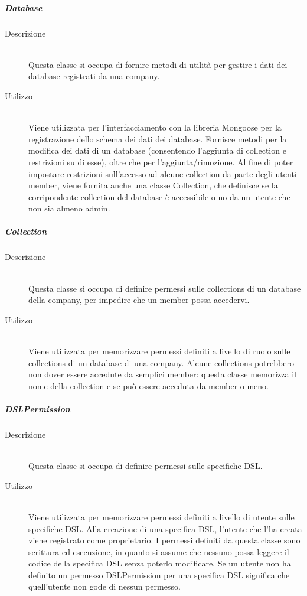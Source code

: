 \subparagraph{Database}
\begin{description}
\item[Descrizione] \hfill \\
Questa classe si occupa di fornire metodi di utilità per gestire i dati dei database registrati da una company.
\item[Utilizzo] \hfill \\
Viene utilizzata per l’interfacciamento con la libreria Mongoose per la registrazione dello schema dei dati dei database. Fornisce metodi per la modifica dei dati di un database (consentendo l'aggiunta di collection e restrizioni su di esse), oltre che per l'aggiunta/rimozione. Al fine di poter impostare restrizioni sull'accesso ad alcune collection da parte degli utenti member, viene fornita anche una classe Collection, che definisce se la corripondente collection del database è accessibile o no da un utente che non sia almeno admin.
\end{description}
\subparagraph{Collection}
\begin{description}
\item[Descrizione] \hfill \\
Questa classe si occupa di definire permessi sulle collections di un database della company, per impedire che un member possa accedervi.
\item[Utilizzo] \hfill \\
Viene utilizzata per memorizzare permessi definiti a livello di ruolo sulle collections di un database di una company. Alcune collections potrebbero non dover essere accedute da semplici member: questa classe memorizza il nome della collection e se può essere acceduta da member o meno.
\end{description}
\subparagraph{DSLPermission}
\begin{description}
\item[Descrizione] \hfill \\
Questa classe si occupa di definire permessi sulle specifiche DSL.
\item[Utilizzo] \hfill \\
Viene utilizzata per memorizzare permessi definiti a livello di utente sulle specifiche DSL. Alla creazione di una specifica DSL, l'utente che l'ha creata viene registrato come proprietario. I permessi definiti da questa classe sono scrittura ed esecuzione, in quanto si assume che nessuno possa leggere il codice della specifica DSL senza poterlo modificare. Se un utente non ha definito un permesso DSLPermission per una specifica DSL significa che quell'utente non gode di nessun permesso.
\end{description}
